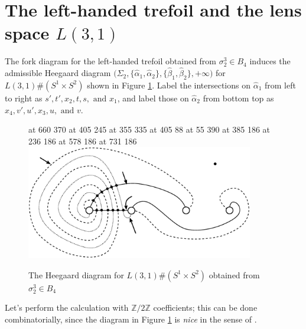 \documentclass[11pt]{article}
\theoremstyle{plain} \newtheorem{thm}{Theorem}[subsection]
\theoremstyle{plain} \newtheorem{cor}[thm]{Corollary}
\theoremstyle{plain} \newtheorem{prop}[thm]{Proposition}
\theoremstyle{plain} \newtheorem{conj}[thm]{Conjecture}
\theoremstyle{plain} \newtheorem{lem}[thm]{Lemma}
\theoremstyle{definition} \newtheorem{df}[thm]{Definition}
\theoremstyle{remark} \newtheorem{rmk}[thm]{Remark}
\theoremstyle{remark} \newtheorem{obs}[thm]{Observation}
\newcommand{\B}[1]{B_{#1} }
\newcommand{\SUM}[1]{#1 \#(S^{1}\times S^{2})}
\newcommand{\ah}{\widehat{\alpha}}
\newcommand{\bh}{\widehat{\beta}}
\newcommand{\Zcaltwo}{\mathbb{Z}/2\mathbb{Z}}
\begin{document}
\section{The left-handed trefoil and the lens space $L(3,1)$}

The fork diagram for the left-handed trefoil obtained from $\sigma_{2}^{3} \in \B{4}$ induces the admissible Heegaard diagram $\big( \Sigma_{2}, \{ \ah_{1}, \ah_{2} \},  \{ \bh_{1}, \bh_{2} \}, +\infty \big)$ for $\SUM{L(3,1)}$ shown in Figure \ref{fig:exhd}.  Label the intersections on $\ah_{1}$ from left to right as $s',t',x_{2},t,s,\text{ and }x_{1}$, and label those on $\ah_{2}$ from bottom top as $x_{4},v', u', x_{3}, u,\text{ and }v$.

\begin{figure}[h!]
\centering
{} 
\small
\pinlabel* {$+\infty$} at 660 370
\pinlabel* {$\ah_{1}$} at 405 245
\pinlabel* {$\ah_{2}$} at 355 335
\pinlabel* {$\bh_{1}$} at 405 88
\pinlabel* {$\bh_{2}$} at 55 390
 at 385 186
 at 236 186
 at 578 186
 at 731 186
\endlabellist 
\includegraphics[height = 50mm]{ExHD}
\caption{The Heegaard diagram for $\SUM{L(3,1)}$ obtained from $\sigma_{2}^{3} \in \B{4}$}
\label{fig:exhd}
\end{figure}

Let's perform the calculation with $\Zcaltwo$ coefficients; this can be done combinatorially, since the diagram in Figure \ref{fig:exhd} is \textit{nice} in the sense of \cite{sw:CHF}.
\end{document}
